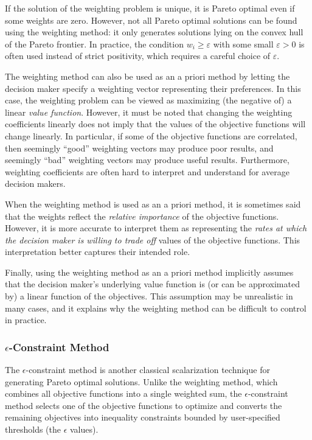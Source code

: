If the solution of the weighting problem is unique, it is Pareto optimal even if some weights are zero. However, not all Pareto optimal solutions can be found using the weighting method: it only generates solutions lying on the convex hull of the Pareto frontier. In practice, the condition $w_i \geq \varepsilon$ with some small $\varepsilon > 0$ is often used instead of strict positivity, which requires a careful choice of $\varepsilon$.

The weighting method can also be used as an a priori method by letting the decision maker specify a weighting vector representing their preferences. In this case, the weighting problem can be viewed as maximizing (the negative of) a linear \emph{value function}. However, it must be noted that changing the weighting coefficients linearly does not imply that the values of the objective functions will change linearly. In particular, if some of the objective functions are correlated, then seemingly “good” weighting vectors may produce poor results, and seemingly “bad” weighting vectors may produce useful results. Furthermore, weighting coefficients are often hard to interpret and understand for average decision makers. 

When the weighting method is used as an a priori method, it is sometimes said that the weights reflect the \emph{relative importance} of the objective functions. However, it is more accurate to interpret them as representing the \emph{rates at which the decision maker is willing to trade off} values of the objective functions. This interpretation better captures their intended role.

Finally, using the weighting method as an a priori method implicitly assumes that the decision maker’s underlying value function is (or can be approximated by) a linear function of the objectives. This assumption may be unrealistic in many cases, and it explains why the weighting method can be difficult to control in practice.

\subsubsection{\texorpdfstring{$\epsilon$}{epsilon}-Constraint Method}
\label{sub:epsilon_constraint_method}

The $\epsilon$-constraint method is another classical scalarization technique for generating Pareto optimal solutions. Unlike the weighting method, which combines all objective functions into a single weighted sum, the $\epsilon$-constraint method selects one of the objective functions to optimize and converts the remaining objectives into inequality constraints bounded by user-specified thresholds (the $\epsilon$ values).

